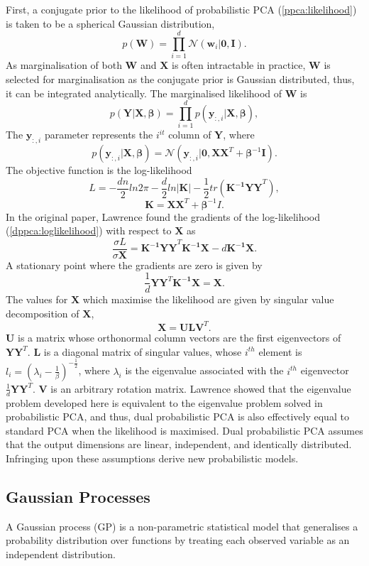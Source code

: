 \documentclass[ %
author={Dillon Keith Diep},
supervisor={Dr. Carl Henrik Ek},
degree={MEng},
title={ART-CG:},
subtitle={Assisted Real-time Content Generation of 3D Hair by Learning Manifolds},
type={Research},
year={2017} ]{dissertation}
\begin{document}
First, a conjugate prior to the likelihood of probabilistic PCA (\ref{ppca:likelihood}) is taken to be a spherical Gaussian distribution,
$$p(\bm{W})=\prod^d_{i=1}\mathcal{N}(\bm{w}_i|\bm{0,I}).$$
As marginalisation of both $\bm{W}$ and $\bm{X}$ is often intractable in practice, $\bm{W}$ is selected for marginalisation as the conjugate prior is Gaussian distributed, thus, it can be integrated analytically.
The marginalised likelihood of $\bm{W}$ is
$$p(\bm{Y|X},\bm{\beta})=\prod^d_{i=1}p(\bm{y}_{:,i}|\bm{X},\bm{\beta}),$$
The $\bm{y}_{:,i}$ parameter represents the $i^{it}$ column of $\bm{Y}$, where
$$p(\bm{y}_{:,i}|\bm{X},\bm{\beta})=\mathcal{N}(\bm{y}_{:,i}|\bm{0,XX}^T+\bm{\beta}^{-1}\bm{I}).$$
The objective function is the log-likelihood
\begin{equation} \label{dppca:loglikelihood}
L=-\frac{dn}{2}ln2\pi-\frac{d}{2}ln|\bm{K}|-\frac{1}{2}tr(\bm{K^{-1}YY}^T),
\end{equation}
$$\bm{K=XX}^T+\bm{\beta}^{-1}I.$$
In the original paper, Lawrence found the gradients of the log-likelihood (\ref{dppca:loglikelihood}) with respect to $\bm{X}$ as
$$\frac{\sigma L}{\sigma \bm{X}}=\bm{K^{-1}YY}^T\bm{K^{-1}X}-d\bm{K^{-1}X}.$$ 
A stationary point where the gradients are zero is given by
$$\frac{1}{d}\bm{YY}^T\bm{K^{-1}X=X}.$$
The values for $\bm{X}$ which maximise the likelihood are given by singular value decomposition of $\bm{X}$,
$$\bm{X=ULV}^T.$$
$\bm{U}$ is a matrix whose orthonormal column vectors are the first eigenvectors of $\bm{YY}^T$. $\bm{L}$ is a diagonal matrix of singular values, whose $i^{th}$ element is $l_i=(\lambda_i-\frac{1}{\beta})^{-\frac{1}{2}}$, where $\lambda_i$ is the eigenvalue associated with the $i^{th}$ eigenvector $\frac{1}{d}\bm{YY}^T$. $\bm{V}$ is an arbitrary rotation matrix. Lawrence showed that the eigenvalue problem developed here is equivalent to the eigenvalue problem solved in probabilistic PCA, and thus, dual probabilistic PCA is also effectively equal to standard PCA when the likelihood is maximised.
Dual probabilistic PCA assumes that the output dimensions are linear, independent, and identically distributed. Infringing upon these assumptions derive new probabilistic models.

\subsection{Gaussian Processes}
A Gaussian process (GP) is a non-parametric statistical model that generalises a probability distribution over functions by treating each observed variable as an independent distribution.
\end{document}
